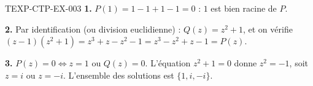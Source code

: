 \begin{corrige}{TEXP-CTP-EX-003}
\textbf{1.} $P(1) = 1-1+1-1=0$ : $1$ est bien racine de $P$.

\textbf{2.} Par identification (ou division euclidienne) : $Q(z)=z^2+1$, et on vérifie $(z-1)(z^2+1) = z^3+z-z^2-1 = z^3-z^2+z-1 = P(z)$.

\textbf{3.} $P(z)=0 \iff z=1$ ou $Q(z)=0$. L'équation $z^2+1=0$ donne $z^2=-1$, soit $z=i$ ou $z=-i$. L'ensemble des solutions est $\{1,i,-i\}$.
\end{corrige}
